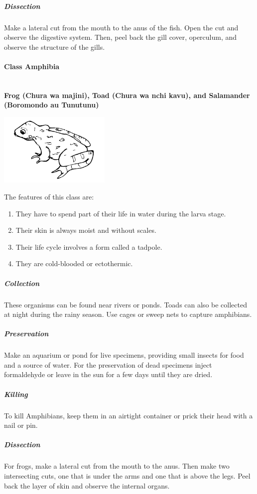 \begin{multicols}{2}
\subparagraph{Dissection}
Make a lateral cut from the mouth to the anus of the fish. Open the cut and observe the digestive system. Then, peel back the gill cover, operculum, and observe the structure of the gills.

\paragraph{Class Amphibia}\hfill \\
\textbf{Frog (Chura wa majini), Toad (Chura wa nchi kavu), and Salamander (Boromondo au Tunutunu)}

\begin{center}
\includegraphics[width=0.4\textwidth]{./img/frog.png}
\end{center}

The features of this class are:
\begin{enumerate}
\item{They have to spend part of their life in water during the larva stage.}
\item{Their skin is always moist and without scales.}
\item{Their life cycle involves a form called a tadpole.}
\item{They are cold-blooded or ectothermic.}
\end{enumerate}

\subparagraph{Collection}
These organisms can be found near rivers or ponds. Toads can also be collected at night during the rainy season. Use cages or sweep nets to capture amphibians.

\subparagraph{Preservation} 
Make an aquarium or pond for live specimens, providing small insects for food and a source of water. For the preservation of dead specimens inject formaldehyde or leave in the sun for a few days until they are dried.

\subparagraph{Killing}
To kill Amphibians, keep them in an airtight container or prick their head with a nail or pin.

\subparagraph{Dissection}
For frogs, make a lateral cut from the mouth to the anus. Then make two intersecting cuts, one that is under the arms and one that is above the legs. Peel back the layer of skin and observe the internal organs.


\end{multicols}
